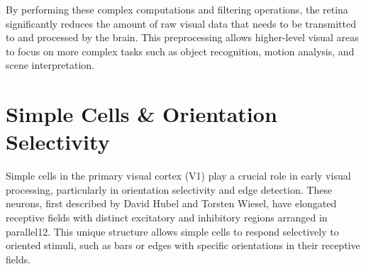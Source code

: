 By performing these complex computations and filtering operations, the retina significantly reduces the amount of raw visual data that needs to be transmitted to and processed by the brain. This preprocessing allows higher-level visual areas to focus on more complex tasks such as object recognition, motion analysis, and scene interpretation.

\section{Simple Cells \& Orientation Selectivity}
Simple cells in the primary visual cortex (V1) play a crucial role in early visual processing, particularly in orientation selectivity and edge detection. These neurons, first described by David Hubel and Torsten Wiesel, have elongated receptive fields with distinct excitatory and inhibitory regions arranged in parallel12. This unique structure allows simple cells to respond selectively to oriented stimuli, such as bars or edges with specific orientations in their receptive fields.

